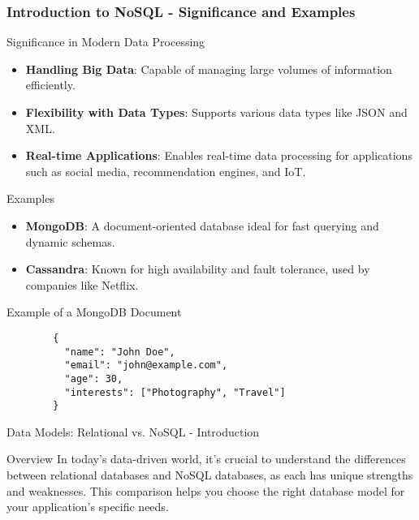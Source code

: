 \documentclass[aspectratio=169]{beamer}
\begin{document}
\begin{frame}[fragile]
    \frametitle{Introduction to NoSQL - Significance and Examples}
    \begin{block}{Significance in Modern Data Processing}
        \begin{itemize}
            \item \textbf{Handling Big Data}: Capable of managing large volumes of information efficiently.
            \item \textbf{Flexibility with Data Types}: Supports various data types like JSON and XML.
            \item \textbf{Real-time Applications}: Enables real-time data processing for applications such as social media, recommendation engines, and IoT.
        \end{itemize}
    \end{block}

    \begin{block}{Examples}
        \begin{itemize}
            \item \textbf{MongoDB}: A document-oriented database ideal for fast querying and dynamic schemas.
            \item \textbf{Cassandra}: Known for high availability and fault tolerance, used by companies like Netflix.
        \end{itemize}
    \end{block}
    
    \begin{block}{Example of a MongoDB Document}
        \begin{lstlisting}
        {
          "name": "John Doe",
          "email": "john@example.com",
          "age": 30,
          "interests": ["Photography", "Travel"]
        }
        \end{lstlisting}
    \end{block}
\end{frame}

\begin{frame}[fragile]{Data Models: Relational vs. NoSQL - Introduction}
    \begin{block}{Overview}
        In today's data-driven world, it's crucial to understand the differences between relational databases and NoSQL databases, as each has unique strengths and weaknesses. This comparison helps you choose the right database model for your application's specific needs.
    \end{block}
\end{frame}
\end{document}
